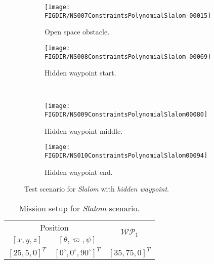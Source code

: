     \begin{figure}[H]
        \centering
        \begin{subfigure}{0.48\textwidth}
            \texttt{[image: \\FIGDIR/NS007ConstraintsPolynomialSlalom-00015]}
            \caption{Open space obstacle.}
            \label{fig:slalomOpenSpaceObstacle}
        \end{subfigure}
        \begin{subfigure}{0.48\textwidth}
            \texttt{[image: \\FIGDIR/NS008ConstraintsPolynomialSlalom-00069]} 
            \caption{Hidden waypoint start.}
            \label{fig:slalomHiddenWaypointStart}
        \end{subfigure}
        \\
        \begin{subfigure}{0.48\textwidth}
            \texttt{[image: \\FIGDIR/NS009ConstraintsPolynomialSlalom00080]} 
            \caption{Hidden waypoint middle.}
            \label{fig:slalomHiddenWaypointMiddle}
        \end{subfigure}
        \begin{subfigure}{0.48\textwidth}
            \texttt{[image: \\FIGDIR/NS010ConstraintsPolynomialSlalom00094]} 
            \caption{Hidden waypoint end.}
            \label{fig:slalomHiddenWaypointEnd}
        \end{subfigure}
        \caption{Test scenario for \emph{Slalom} with \emph{hidden waypoint}. }
        \label{fig:testCaseSlalomwithHiddenWaypoint}
    \end{figure}
    
    
    \begin{table}[H]
        \centering
        \begin{tabular}{c|c||c}
            \multicolumn{2}{c||}{Position} & \multirow{2}{*}{$\mathscr{WP}_1$} \\\cline{1-2}
            $[x,y,z]$           & $[\theta,\varpi,\psi]$           & \\\hline\hline
            $[25,5,0]^T $        & $[0^\circ,0^\circ,90^\circ]^T$    & $[35,75,0]^T$        \\ 
        \end{tabular}
        \caption{Mission setup for \emph{Slalom} scenario.}
        \label{tab:missionSetupSlalomScenario}
    \end{table}
    
